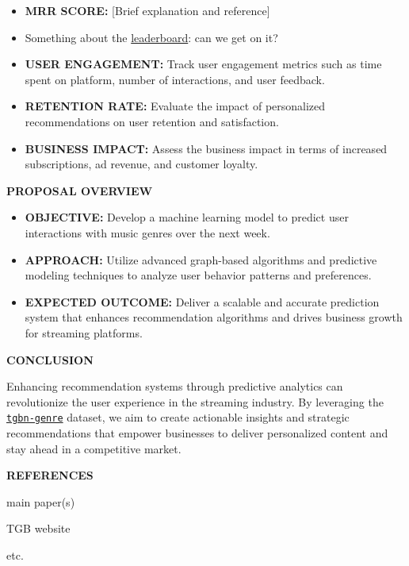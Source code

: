 \documentclass[10pt, letterpaper]{article}
\renewcommand{\section}[1]{%
	    \vspace{\parskip}
		{\large \bfseries\uppercase{#1}}
}
\newcommand{\itemTitle}[1]{%
	{\bfseries\uppercase{#1}}
}
\begin{document}
\begin{itemize}
\item \itemTitle{MRR score:} [Brief explanation and reference]
\item Something about the
{\href{https://tgb.complexdatalab.com/docs/leader_nodeprop/\#tgbn-genre}{leaderboard}}:
 can we get on it?
\item \itemTitle{User Engagement:} Track user engagement metrics such 
as 
time spent on platform, number of interactions, and user feedback.
\item \itemTitle{Retention Rate:} Evaluate the impact of personalized 
recommendations on user retention and satisfaction.
\item \itemTitle{Business Impact:} Assess the business impact in 
terms 
of increased subscriptions, ad revenue, and customer loyalty.
\end{itemize}
	
\section{Proposal Overview}

\begin{itemize}
\item \itemTitle{Objective:} Develop a machine learning model to 
predict 
user interactions with music genres over the next week.
\item \itemTitle{Approach:} Utilize advanced graph-based algorithms 
and 
predictive modeling techniques to analyze user behavior patterns and 
preferences.
\item \itemTitle{Expected Outcome:} Deliver a scalable and accurate 
prediction system that enhances recommendation algorithms and drives 
business growth for streaming platforms.
\end{itemize}
	
\section{Conclusion}

Enhancing recommendation systems through predictive analytics can  
revolutionize the user experience in the streaming industry. By 
leveraging the 
\href{https://tgb.complexdatalab.com/docs/nodeprop/}{\tt{tgbn-genre}} 
dataset, we aim to create actionable insights and strategic 
recommendations that empower businesses to deliver personalized 
content and stay ahead in a competitive market.

\section{References}

main paper(s)

TGB website 

etc.
	
\end{document}

